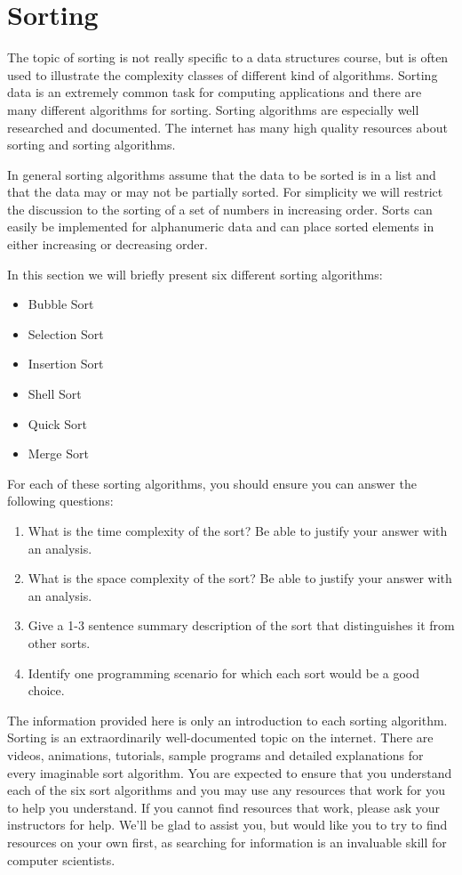 
\chapter{Sorting}
The topic of sorting is not really specific to a data structures course, but is often used to illustrate the complexity classes of different kind of algorithms.   Sorting data is an extremely common task for computing applications and there are many  different algorithms for sorting.   Sorting algorithms are especially well researched and documented.  The internet has many high quality resources about sorting and sorting algorithms.

In general sorting algorithms assume that the data to be sorted is in a list and that the data may or may not be partially sorted.  For simplicity we will restrict the discussion to the sorting of a set of numbers in increasing order.   Sorts can easily be implemented for alphanumeric data and can place sorted elements in either increasing or decreasing order.

In this section we will briefly present six different sorting algorithms:
\begin{itemize}
\item Bubble Sort
\item Selection Sort
\item Insertion Sort
\item Shell Sort
\item Quick Sort
\item Merge Sort
\end{itemize}

For each of these sorting algorithms,  you should ensure you can answer the following questions:

\begin{enumerate}
\item What is the time complexity of the sort?  Be able to justify your answer with an analysis.
\item What is the space complexity of the sort? Be able to justify your answer with an analysis.
\item Give a 1-3 sentence summary description of the sort that distinguishes it from other sorts.
\item Identify one programming scenario for which each sort would be a good choice.
\end{enumerate}

The information provided here is only an introduction to each sorting algorithm.  Sorting is an extraordinarily well-documented topic on the internet.  There are videos, animations, tutorials,  sample programs and detailed explanations for every imaginable sort algorithm.    You are expected to ensure that you understand each  of the six sort algorithms and you may  use any resources that work for you to help you understand.   If you cannot find resources that work, please ask your instructors for help.  We'll be glad to assist you, but would like you to try to find resources on your own first, as  searching for information is an invaluable skill for computer scientists.

